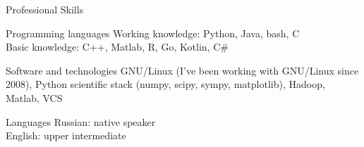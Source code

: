 \documentclass{resume}
\begin{document}
\begin{rSection}{Professional Skills}
  \begin{rSubsection}{Programming languages}{}{}
    Working knowledge: Python, Java, bash, C \\
    Basic knowledge: C++, Matlab, R, Go, Kotlin, C\#
  \end{rSubsection}

  \begin{rSubsection}{Software and technologies}{}{}
    GNU/Linux (I've been working with GNU/Linux since 2008), Python scientific stack (numpy, scipy, sympy, matplotlib), Hadoop, Matlab, VCS
  \end{rSubsection}

  \begin{rSubsection}{Languages}{}{}
    Russian: native speaker \\
    English: upper intermediate
  \end{rSubsection}
\end{rSection}
\end{document}
